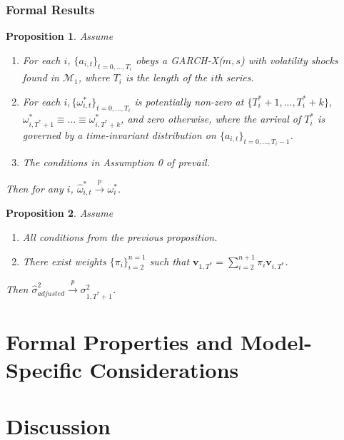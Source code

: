 \documentclass[9pt]{beamer}
\newcommand{\weight}{\pi}
\def\mc#1{\mathcal{#1}} %
\def\mc#1{\mathcal{#1}}
\newtheorem{prop}{Proposition}
\theoremstyle{definition}
\begin{document}
\begin{frame}\frametitle{Formal Results}
    
    \begin{prop}\label{omega_consistency}
    Assume
    \begin{enumerate}
      \item For each $i$, $\{a_{i,t}\}_{t=0,...,T_i}$ obeys a GARCH-X($m,s$) with volatility shocks found in $\mc{M}_{1}$, where $T_i$ is the length of the $i$th series.
      \item For each $i, \{\omega_{i,t}^{*}\}_{t=0,...,T_i}$ is potentially non-zero at $\{T^{*}_{i}+1,... ,T^{*}_{i}+k\}$, $\omega_{i,T^{*}+1}^{*}\equiv...\equiv\omega_{i,T^{*}+k}^{*}$, and zero otherwise, where the arrival of $T_{i}^{*}$ is governed by a time-invariant distribution on $\{a_{i,t}\}_{t=0,...,T_i-1}$. \label{stationarity_of_omega_i_t}
      \item The conditions in Assumption 0 of \cite[][]{han2014asymptotic} prevail.
    \end{enumerate}
    Then for any $i$, $\hat\omega_{i,t}^{*} \xrightarrow{p} \omega_{i}^{*}$.
    \end{prop}

    \begin{prop}\label{sigma_consistency}
        Assume
        \begin{enumerate}
          \item All conditions from the previous proposition.
          \item There exist weights $\{\pi_{i}\}_{i=2}^{n=1}$ such that $\textbf{v}_{1,T^{*}} = \sum^{n+1}_{i=2}\weight_{i} \textbf{v}_{i,T^{*}}$.
         \end{enumerate}
      Then $\hat\sigma^{2}_{adjusted}\xrightarrow{p}\sigma^{2}_{1,T^{*}+1}$. 
      \end{prop}

\end{frame}

\section{Formal Properties and Model-Specific Considerations}


\section{Discussion}
\end{document}
